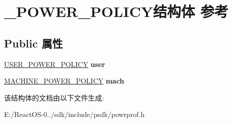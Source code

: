 \hypertarget{struct___p_o_w_e_r___p_o_l_i_c_y}{}\section{\+\_\+\+P\+O\+W\+E\+R\+\_\+\+P\+O\+L\+I\+C\+Y结构体 参考}
\label{struct___p_o_w_e_r___p_o_l_i_c_y}
\subsection*{Public 属性}
\begin{DoxyCompactItemize}
\item 
\mbox{\label{struct___p_o_w_e_r___p_o_l_i_c_y_af8af8bdd6557d6a9bfeb90cda8aa16b4}} 
\hyperlink{struct___u_s_e_r___p_o_w_e_r___p_o_l_i_c_y}{U\+S\+E\+R\+\_\+\+P\+O\+W\+E\+R\+\_\+\+P\+O\+L\+I\+CY} {\bfseries user}
\item 
\mbox{\label{struct___p_o_w_e_r___p_o_l_i_c_y_a2ae7a16ea3d21fa53ac4928fe55a27ae}} 
\hyperlink{struct___m_a_c_h_i_n_e___p_o_w_e_r___p_o_l_i_c_y}{M\+A\+C\+H\+I\+N\+E\+\_\+\+P\+O\+W\+E\+R\+\_\+\+P\+O\+L\+I\+CY} {\bfseries mach}
\end{DoxyCompactItemize}


该结构体的文档由以下文件生成\+:\begin{DoxyCompactItemize}
\item 
E\+:/\+React\+O\+S-\/0../sdk/include/psdk/powrprof.\+h\end{DoxyCompactItemize}
